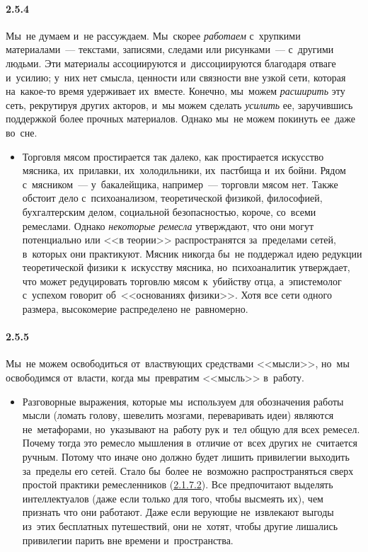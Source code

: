 \paragraph{2.5.4}\hypertarget{par:2.5.4}{} Мы~не думаем и~не рассуждаем. Мы~скорее {\itshape работаем} с~хрупкими материалами~--- текстами, записями, следами или рисунками~--- с~другими людьми. Эти материалы ассоциируются и~диссоциируются благодаря отваге и~усилию; у~них нет смысла, ценности или связности вне узкой сети, которая на~какое-то время удерживает их~вместе. Конечно, мы~можем {\itshape расширить} эту сеть, рекрутируя других акторов, и~мы можем сделать {\itshape усилить} ее, заручившись поддержкой более прочных материалов. Однако мы~не можем покинуть ее~даже во~сне.
	\begin{itemize}
	\item 
	Торговля мясом простирается так далеко, как простирается искусство мясника, их~прилавки, их~холодильники, их~пастбища и~их бойни. Рядом с~мясником~--- у~бакалейщика, например~--- торговли мясом нет. Также обстоит дело с~психоанализом, теоретической физикой, философией, бухгалтерским делом, социальной безопасностью, короче, со~всеми ремеслами. Однако {\itshape некоторые ремесла }утверждают, что они могут потенциально или <<в теории>> распространятся за~пределами сетей, в~которых они практикуют. Мясник никогда бы~не поддержал идею редукции теоретической физики к~искусству мясника, но~психоаналитик утверждает, что может редуцировать торговлю мясом к~убийству отца, а~эпистемолог с~успехом говорит об~<<основаниях физики>>. Хотя все сети одного размера, высокомерие распределено не~равномерно.
	\end{itemize}

\paragraph{2.5.5}\hypertarget{par:2.5.5}{} Мы~не можем освободиться от~властвующих средствами <<мысли>>, но~мы освободимся от~власти, когда мы~превратим <<мысль>> в~работу. 
	\begin{itemize}
	\item 
	Разговорные выражения, которые мы~используем для обозначения работы мысли (ломать голову, шевелить мозгами, переваривать идеи) являются не~метафорами, но~указывают на~работу рук и~тел общую для всех ремесел. Почему тогда это ремесло мышления в~отличие от~всех других не~считается ручным. Потому что иначе оно должно будет лишить привилегии выходить за~пределы его сетей. Стало бы~более не~возможно распространяться сверх простой практики ремесленников (\hyperlink{par:2.1.7.2}{2.1.7.2}). Все предпочитают выделять интеллектуалов (даже если только для того, чтобы высмеять их), чем признать что они работают. Даже если верующие не~извлекают выгоды из~этих бесплатных путешествий, они не~хотят, чтобы другие лишались привилегии парить вне времени и~пространства.
	\end{itemize}


